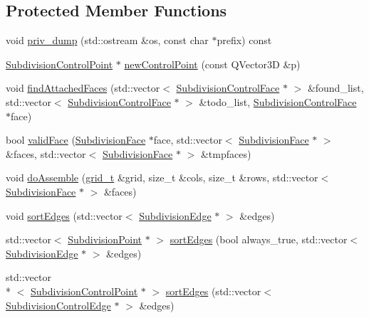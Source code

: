 \subsection*{Protected Member Functions}
\begin{DoxyCompactItemize}
\item 
void \hyperlink{classShipCAD_1_1SubdivisionSurface_a5c88eb988cc6a439242264bc54a6e3e1}{priv\-\_\-dump} (std\-::ostream \&os, const char $\ast$prefix) const 
\item 
\hyperlink{classShipCAD_1_1SubdivisionControlPoint}{Subdivision\-Control\-Point} $\ast$ \hyperlink{classShipCAD_1_1SubdivisionSurface_a251b711125d50aa51875451976e8a8d7}{new\-Control\-Point} (const Q\-Vector3\-D \&p)
\item 
void \hyperlink{classShipCAD_1_1SubdivisionSurface_a3163cfd01e0454ecb9dbb088dc76fbc6}{find\-Attached\-Faces} (std\-::vector$<$ \hyperlink{classShipCAD_1_1SubdivisionControlFace}{Subdivision\-Control\-Face} $\ast$ $>$ \&found\-\_\-list, std\-::vector$<$ \hyperlink{classShipCAD_1_1SubdivisionControlFace}{Subdivision\-Control\-Face} $\ast$ $>$ \&todo\-\_\-list, \hyperlink{classShipCAD_1_1SubdivisionControlFace}{Subdivision\-Control\-Face} $\ast$face)
\item 
bool \hyperlink{classShipCAD_1_1SubdivisionSurface_a5b6204bb0648f2e85cbf07ffbac4bd42}{valid\-Face} (\hyperlink{classShipCAD_1_1SubdivisionFace}{Subdivision\-Face} $\ast$face, std\-::vector$<$ \hyperlink{classShipCAD_1_1SubdivisionFace}{Subdivision\-Face} $\ast$ $>$ \&faces, std\-::vector$<$ \hyperlink{classShipCAD_1_1SubdivisionFace}{Subdivision\-Face} $\ast$ $>$ \&tmpfaces)
\item 
void \hyperlink{classShipCAD_1_1SubdivisionSurface_ac322d8008ea13bc3ca3fd1baeab7e1b3}{do\-Assemble} (\hyperlink{classShipCAD_1_1SubdivisionSurface_a69d4a3ca038ee247d0abcffa6125df95}{grid\-\_\-t} \&grid, size\-\_\-t \&cols, size\-\_\-t \&rows, std\-::vector$<$ \hyperlink{classShipCAD_1_1SubdivisionFace}{Subdivision\-Face} $\ast$ $>$ \&faces)
\item 
void \hyperlink{classShipCAD_1_1SubdivisionSurface_a2b270b878bb810d51bd7adf689db5366}{sort\-Edges} (std\-::vector$<$ \hyperlink{classShipCAD_1_1SubdivisionEdge}{Subdivision\-Edge} $\ast$ $>$ \&edges)
\item 
std\-::vector$<$ \hyperlink{classShipCAD_1_1SubdivisionPoint}{Subdivision\-Point} $\ast$ $>$ \hyperlink{classShipCAD_1_1SubdivisionSurface_abbabb02057a2e66d2a37ec84696788e9}{sort\-Edges} (bool always\-\_\-true, std\-::vector$<$ \hyperlink{classShipCAD_1_1SubdivisionEdge}{Subdivision\-Edge} $\ast$ $>$ \&edges)
\item 
std\-::vector\\*
$<$ \hyperlink{classShipCAD_1_1SubdivisionControlPoint}{Subdivision\-Control\-Point} $\ast$ $>$ \hyperlink{classShipCAD_1_1SubdivisionSurface_a8650bf95c9eb2de0e0b1342bfacbe82a}{sort\-Edges} (std\-::vector$<$ \hyperlink{classShipCAD_1_1SubdivisionControlEdge}{Subdivision\-Control\-Edge} $\ast$ $>$ \&edges)
\end{DoxyCompactItemize}
